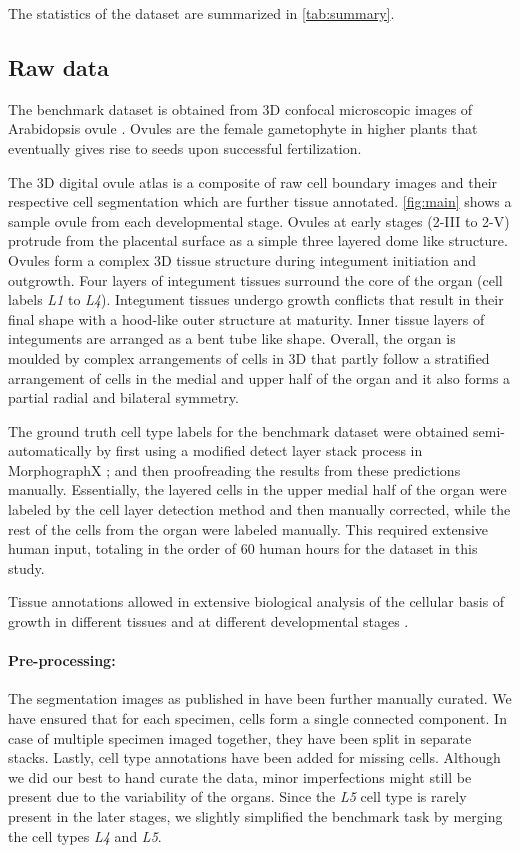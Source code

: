 \documentclass[10pt,twocolumn,letterpaper]{article}
\begin{document}
The statistics of the dataset are summarized in \cref{tab:summary}.

\subsection{Raw data}
The benchmark dataset is obtained from 3D confocal microscopic images of Arabidopsis ovule \cite{vijayan2021digital}. Ovules are the female gametophyte in higher plants that eventually gives rise to seeds upon successful fertilization.

The 3D digital ovule atlas is a composite of raw cell boundary images and their respective cell segmentation which are further tissue annotated. \cref{fig:main} shows a sample ovule from each developmental stage. Ovules at early stages (2-III to 2-V) protrude from the placental surface as a simple three layered dome like structure. Ovules form a complex 3D tissue structure during integument initiation and outgrowth. Four layers of integument tissues surround the core of the organ (cell labels \textit{L1} to \textit{L4}). Integument tissues undergo growth conflicts that result in their final shape with a hood-like outer structure at maturity. Inner tissue layers of integuments are arranged as a bent tube like shape.
Overall, the organ is moulded by complex arrangements of cells in 3D that partly follow a stratified arrangement of cells in the medial and upper half of the organ and it also forms a partial radial and bilateral symmetry.

The ground truth cell type labels for the benchmark dataset were obtained semi-automatically by first using a modified detect layer stack process in MorphographX \cite{strauss2021morphographx}; and then proofreading the results from these predictions manually. Essentially, the layered cells in the upper medial half of the organ were labeled by the cell layer detection method and then manually corrected, while the rest of the cells from the organ were labeled manually.
This required extensive human input, totaling in the order of 60 human hours for the dataset in this study.

Tissue annotations allowed in extensive biological analysis of the cellular basis of growth in different tissues and at different developmental stages \cite{vijayan2021digital}. 


\paragraph{Pre-processing:}
The segmentation images as published in \cite{vijayan2021digital} have been further manually curated. We have ensured that for each specimen, cells form a single connected component. In case of multiple specimen imaged together, they have been split in separate stacks. Lastly, cell type annotations have been added for missing cells.
Although we did our best to hand curate the data, minor imperfections might still be present due to the variability of the organs.
Since the \textit{L5} cell type is rarely present in the later stages, we slightly simplified the benchmark task by merging the cell types \textit{L4} and \textit{L5}.
\end{document}
